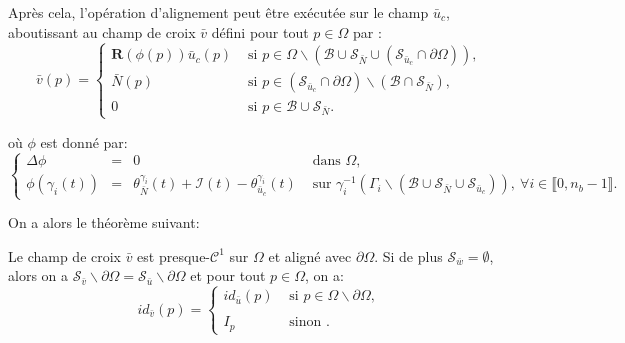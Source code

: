 Après cela, l'opération d'alignement peut être exécutée sur le champ $\bar{u}_c$, aboutissant au champ de croix $\bar{v}$ défini pour tout $p\in\Omega$ par :
\begin{equation}
\bar{v}(p)=
\left\{
\begin{array}{ll}
\mathbf{R}(\phi(p))\bar{u}_c(p) & \mbox{ si } p\in\Omega\backslash(\mathcal{B}\cup\mathcal{S}_{\bar{N}}\cup(\mathcal{S}_{\bar{u}_c}\cap\partial\Omega)),\\[0.5cm]
\bar{N}(p) & \mbox{ si } p\in(\mathcal{S}_{\bar{u}_c}\cap\partial\Omega)\backslash(\mathcal{B}\cap\mathcal{S}_{\bar{N}}),\\[0.5cm]
0 & \mbox{ si } p\in\mathcal{B}\cup\mathcal{S}_{\bar{N}}.
\end{array}
\right.
\label{eqn:etude_def_v_third}
\end{equation}

où $\phi$ est donné par:
\begin{equation}
\left\{
\begin{array}{lcll}
\Delta\phi &=& 0 &\mbox{ dans }\Omega,\\[0.5cm]
\phi(\gamma_i(t))&=&\theta_{\bar{N}}^{\gamma_i}(t)+\mathcal{I}(t)-\theta_{\bar{u}_c}^{\gamma_i}(t) & \mbox{ sur } \gamma_i^{-1}(\Gamma_i\backslash(\mathcal{B}\cup\mathcal{S}_{\bar{N}}\cup\mathcal{S}_{\bar{u}_c})),~\forall i\in\llbracket 0, n_b-1\rrbracket.
\end{array}
\right.
\label{eqn:etude_def_phi_third}
\end{equation}

On a alors le théorème suivant:
\begin{theorem}
\label{thm:theorem4}
Le champ de croix $\bar{v}$ est presque-$\mathcal{C}^1$ sur $\Omega$ et aligné avec $\partial\Omega$. Si de plus $\mathcal{S}_{\bar{w}}=\emptyset$, alors on a $\mathcal{S}_{\bar{v}}\backslash\partial\Omega=\mathcal{S}_{\bar{u}}\backslash\partial\Omega$ et pour tout $p\in\Omega$, on a:
\begin{equation}
id_{\bar{v}}(p)=
\left\{
\begin{array}{ll}
    id_{\bar{u}}(p) & \mbox{ si } p\in\Omega\backslash\partial\Omega,\\\\
    I_p & \mbox{ sinon }.
\end{array}
\right.
\end{equation}
\end{theorem}

